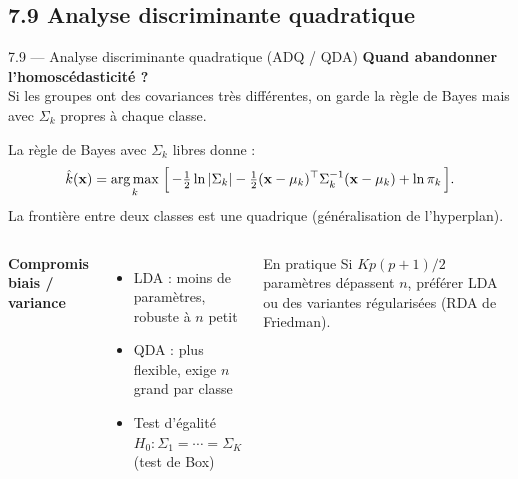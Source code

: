 \subsection{7.9 Analyse discriminante quadratique}
\begin{frame}{7.9 — Analyse discriminante quadratique (ADQ / QDA)}
\textbf{Quand abandonner l'homoscédasticité ?}\\
Si les groupes ont des covariances très différentes, on garde la règle
de Bayes mais avec $\Sigma_k$ propres à chaque classe.

\begin{theorem}
La règle de Bayes avec $\Sigma_k$ libres donne :
\[
\hat{k}(\mathbf{x}) = \operatorname*{arg\,max}_k\;
\Bigl[\, -\tfrac{1}{2}\ln|\Sigma_k|
       -\tfrac{1}{2}(\mathbf{x}-\mu_k)^\top \Sigma_k^{-1}(\mathbf{x}-\mu_k)
       + \ln \pi_k \,\Bigr].
\]
La frontière entre deux classes est une \alert{quadrique} (généralisation de
l'hyperplan).
\end{theorem}

\begin{columns}[T]
\textbf{Compromis biais / variance}
\begin{itemize}\small
  \item LDA : moins de paramètres, robuste à $n$ petit
  \item QDA : plus flexible, exige $n$ \alert{grand} par classe
  \item Test d'égalité $H_0 : \Sigma_1 = \cdots = \Sigma_K$ (test de Box)
\end{itemize}
\begin{block}{En pratique}
\small Si $K p (p+1)/2$ paramètres dépassent $n$, préférer LDA ou des
variantes régularisées (RDA de Friedman).
\end{block}
\end{columns}
\end{frame}

